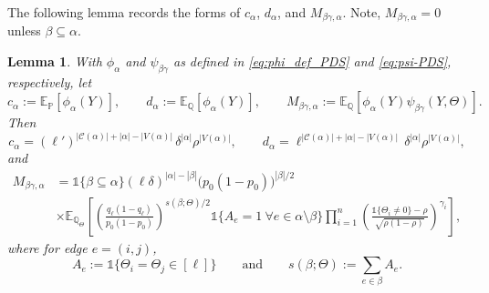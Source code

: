 \documentclass[11pt, letterpaper]{article}
\newtheorem{lemma}[theorem]{Lemma}
\numberwithin{equation}{section}
\newcommand{\E}{\mathbb{E}}
\newcommand{\PP}{\mathbb{P}}
\newcommand{\QQ}{\mathbb{Q}}
\begin{document}
\noindent The following lemma records the forms of \(c_\alpha\), \(d_\alpha\), and \(M_{\beta\gamma,\alpha}\). Note,
\(M_{\beta\gamma,\alpha}=0\) unless \(\beta\subseteq\alpha\).
\begin{lemma}\label{lem:PDS-cMd}
With \(\phi_\alpha\) and \(\psi_{\beta\gamma}\) as defined in \eqref{eq:phi_def_PDS} and \eqref{eq:psi-PDS}, respectively, let
\[
c_\alpha:=\E_{\PP}[\phi_\alpha(Y)],
\qquad
d_\alpha:=\E_{\QQ}[\phi_\alpha(Y)],
\qquad
M_{\beta\gamma,\alpha}:=\E_{\QQ} \left[\phi_\alpha(Y)\psi_{\beta\gamma}(Y,\Theta)\right].
\]
Then
\[
c_\alpha
=
(\ell')^{|\mathcal{C}(\alpha)|+|\alpha|-|V(\alpha)|}\,
\delta^{|\alpha|}\rho^{|V(\alpha)|}, \qquad 
d_\alpha
=
\ell^{|\mathcal{C}(\alpha)|+|\alpha|-|V(\alpha)|}\,
\delta^{|\alpha|}\rho^{|V(\alpha)|},
\]
and
\begin{align*}
M_{\beta\gamma,\alpha}
&=
\mathds 1\{\beta\subseteq\alpha\}
(\ell\delta)^{|\alpha|-|\beta|}
\bigl(p_0(1-p_0)\bigr)^{|\beta|/2}\\
& \times \E_{\QQ_\Theta} \left[
\left(\frac{q_\ell(1-q_\ell)}{p_0(1-p_0)}\right)^{s(\beta;\Theta)/2}
\mathds 1\{A_e=1 \ \forall e\in\alpha\setminus\beta\}
\prod_{i=1}^n
\left(\frac{\mathds 1\{\Theta_i\neq 0\}-\rho}{\sqrt{\rho(1-\rho)}}\right)^{\gamma_i}
\right],
\end{align*}
where for edge $e=(i,j)$,
\begin{equation}\label{eq:pds-ae-sbeta}
A_e:=\mathds 1\{\Theta_i=\Theta_j\in[\ell]\} 
\qquad \text{and} \qquad
s(\beta;\Theta):=\sum_{e\in\beta}A_e.
\end{equation}
\end{lemma}
\end{document}
